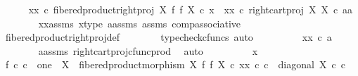 \begin{isabellebody}
\isanewline
\ \ \ \ \isamarkupfalse%
\ {\isachardoublequoteopen}{\isacharparenleft}{\kern0pt}xx\ {\isasymcirc}\isactrlsub c\ fibered{\isacharunderscore}{\kern0pt}product{\isacharunderscore}{\kern0pt}right{\isacharunderscore}{\kern0pt}proj\ X\ f\ f\ X{\isacharparenright}{\kern0pt}\ {\isasymcirc}\isactrlsub c\ x\ {\isacharequal}{\kern0pt}\ xx\ {\isasymcirc}\isactrlsub c\ right{\isacharunderscore}{\kern0pt}cart{\isacharunderscore}{\kern0pt}proj\ X\ X\ {\isasymcirc}\isactrlsub c\ {\isasymlangle}a{\isacharcomma}{\kern0pt}a{\isasymrangle}{\isachardoublequoteclose}\isanewline
\ \ \ \ \ \ \isamarkupfalse%
\ xx{\isacharunderscore}{\kern0pt}assms\ x{\isacharunderscore}{\kern0pt}type\ a{\isacharunderscore}{\kern0pt}assms\ assms\ comp{\isacharunderscore}{\kern0pt}associative{}\isanewline
\ \ \ \ \ \ \isamarkupfalse%
\ fibered{\isacharunderscore}{\kern0pt}product{\isacharunderscore}{\kern0pt}right{\isacharunderscore}{\kern0pt}proj{\isacharunderscore}{\kern0pt}def\isanewline
\ \ \ \ \ \ \isamarkupfalse%
\ {\isacharparenleft}{\kern0pt}typecheck{\isacharunderscore}{\kern0pt}cfuncs{\isacharcomma}{\kern0pt}\ auto{\isacharparenright}{\kern0pt}\isanewline
\ \ \ \ \isamarkupfalse%
\ \isamarkupfalse%
\ {\isachardoublequoteopen}{\isachardot}{\kern0pt}{\isachardot}{\kern0pt}{\isachardot}{\kern0pt}\ {\isacharequal}{\kern0pt}\ xx\ {\isasymcirc}\isactrlsub c\ a{\isachardoublequoteclose}\isanewline
\ \ \ \ \ \ \isamarkupfalse%
\ a{\isacharunderscore}{\kern0pt}assms{\isacharparenleft}{\kern0pt}{}{\isacharparenright}{\kern0pt}\ right{\isacharunderscore}{\kern0pt}cart{\isacharunderscore}{\kern0pt}proj{\isacharunderscore}{\kern0pt}cfunc{\isacharunderscore}{\kern0pt}prod\ \isamarkupfalse%
\ auto\isanewline
\ \ \ \ \isamarkupfalse%
\ \isamarkupfalse%
\ {\isachardoublequoteopen}{\isachardot}{\kern0pt}{\isachardot}{\kern0pt}{\isachardot}{\kern0pt}\ {\isacharequal}{\kern0pt}\ x{\isachardoublequoteclose}\isanewline
\ \ \ \ \isamarkupfalse%
\ {\isacharminus}{\kern0pt}\isanewline
\ \ \ \ \ \ \isamarkupfalse%
\ f{}{\isacharcolon}{\kern0pt}\ {\isachardoublequoteopen}{\isasymforall}c{\isachardot}{\kern0pt}\ c\ {\isacharcolon}{\kern0pt}\ one\ {\isasymrightarrow}\ X\ {\isasymlongrightarrow}\ fibered{\isacharunderscore}{\kern0pt}product{\isacharunderscore}{\kern0pt}morphism\ X\ f\ f\ X\ {\isasymcirc}\isactrlsub c\ xx\ {\isasymcirc}\isactrlsub c\ c\ {\isacharequal}{\kern0pt}\ diagonal\ X\ {\isasymcirc}\isactrlsub c\ c{\isachardoublequoteclose}\isanewline

\end{isabellebody}

